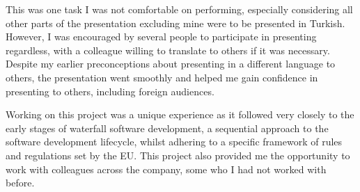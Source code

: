 This was one task I was not comfortable on performing, especially considering all other parts of the
presentation excluding mine were to be presented in Turkish. However, I was encouraged by several
people to participate in presenting regardless, with a colleague willing to translate to others if
it was necessary. Despite my earlier preconceptions about presenting in a different language to
others, the presentation went smoothly and helped me gain confidence in presenting to others,
including foreign audiences.

Working on this project was a unique experience as it followed very closely to the early stages of
waterfall software development, a sequential approach to the software development lifecycle, whilst
adhering to a specific framework of rules and regulations set by the EU\@. This project also
provided me the opportunity to work with colleagues across the company, some who I had not worked
with before.
